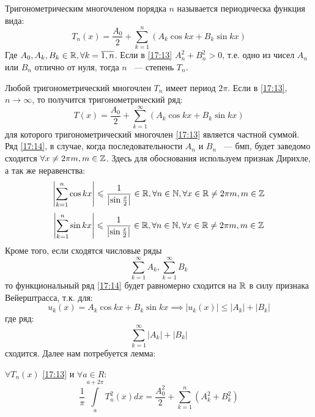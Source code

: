 \documentclass[../../main.tex]{subfiles}
\begin{document}
Тригонометрическим многочленом порядка $n$ называется периодическа функция вида:
\begin{equation}
\label{17:13}
T_n(x) = \frac{A_0}{2} + \sum_{k=1}^{n} \left( A_k \cos{kx} + B_k \sin{kx}\right)
\end{equation}
Где $A_0,A_k,B_k \in \mathbb{R}, \forall k = \overline{1,n}$. Если в \eqref{17:13} $A_n ^ 2 + B_n ^ 2 > 0$, т.е. одно из чисел $A_n$ или $B_n$ отлично от нуля, тогда $n$ ~--- степень $T_n$.

Любой тригонометрический многочлен $T_n$ имеет период $2\pi$. Если в \eqref{17:13}, $n \to \infty$, то получится тригонометрический ряд:
\begin{equation}
\label{17:14}
T(x) = \frac{A_0}{2} + \sum_{k=1}^{\infty} \left( A_k \cos{kx} + B_k \sin{kx}\right)
\end{equation}
для которого тригонометрический многочлен \eqref{17:13} является частной суммой. Ряд \eqref{17:14}, в случае, когда последовательности $A_n$ и $B_n$ ~--- бмп, будет заведомо сходится $\forall x \ne 2\pi m, m \in \mathbb{Z}$. Здесь для обоснования используем признак Дирихле, а так же неравенства:
\[  \left| \sum_{k=1}^{n} \cos{kx} \right| \leqslant \frac{1}{ \left| \sin{\frac{x}{2}} \right| } \in \mathbb{R}, \forall n \in \mathbb{N}, \forall x \in \mathbb{R} \ne 2\pi m, m \in \mathbb{Z}      \]
\[  \left| \sum_{k=1}^{n} \sin{kx} \right| \leqslant \frac{1}{ \left| \sin{\frac{x}{2}}\right| } \in \mathbb{R}, \forall n \in \mathbb{N}, \forall x \in \mathbb{R} \ne 2\pi m, m \in \mathbb{Z}    \]
Кроме того, если сходятся числовые ряды
\[  \sum_{k=1}^{\infty} A_k,\sum_{k=1}^{\infty} B_k   \]
то функциональный ряд \eqref{17:14} будет равномерно сходится на $\mathbb{R}$ в силу признака Вейерштрасса, т.к. для:
\[ u_k(x) = A_k \cos{kx} + B_k \sin{kx}  \implies \left| u_k(x)\right|  \le \left| A_k \right| + \left| B_k \right|  \]
где ряд:
\[  \sum_{k=1}^{\infty} \left| A_k \right| + \left| B_k \right|  \]
сходится. Далее нам потребуется лемма:
\begin{lemma}
	$\forall T_n(x)$ \eqref{17:13} и  $\forall a \in R$:\\
	\begin{equation}
	\label{17:15}
	\frac{1}{\pi} \int\limits_{a}^{a+2\pi} T_n^2(x)dx = \frac{A_0^2}{2} + \sum_{k=1}^{n} \left( A_k^2 + B_k^2 \right)
	\end{equation}
\end{lemma}
\end{document}
